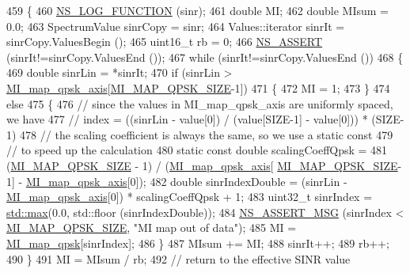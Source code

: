 \begin{DoxyCode}
459 \{
460   \hyperlink{log-macros-disabled_8h_a90b90d5bad1f39cb1b64923ea94c0761}{NS\_LOG\_FUNCTION} (sinr);
461   \textcolor{keywordtype}{double} MI;
462   \textcolor{keywordtype}{double} MIsum = 0.0;
463   SpectrumValue sinrCopy = sinr;
464   Values::iterator sinrIt = sinrCopy.ValuesBegin ();
465   uint16\_t rb = 0;
466   \hyperlink{assert_8h_a6dccdb0de9b252f60088ce281c49d052}{NS\_ASSERT} (sinrIt!=sinrCopy.ValuesEnd ());
467   \textcolor{keywordflow}{while} (sinrIt!=sinrCopy.ValuesEnd ())
468     \{
469       \textcolor{keywordtype}{double} sinrLin = *sinrIt;
470       \textcolor{keywordflow}{if} (sinrLin > \hyperlink{namespacens3_a8170078bba1537f2165fdd97e9a49d0f}{MI\_map\_qpsk\_axis}[\hyperlink{namespacens3_aae59b755610c3c0be0b839e4dcc933d6}{MI\_MAP\_QPSK\_SIZE}-1])
471         \{
472           MI = 1;
473         \}
474       \textcolor{keywordflow}{else} 
475         \{ 
476           \textcolor{comment}{// since the values in MI\_map\_qpsk\_axis are uniformly spaced, we have}
477           \textcolor{comment}{// index = ((sinrLin - value[0]) / (value[SIZE-1] - value[0])) * (SIZE-1)}
478               \textcolor{comment}{// the scaling coefficient is always the same, so we use a static const}
479               \textcolor{comment}{// to speed up the calculation}
480           \textcolor{keyword}{static} \textcolor{keyword}{const} \textcolor{keywordtype}{double} scalingCoeffQpsk = 
481             (\hyperlink{namespacens3_aae59b755610c3c0be0b839e4dcc933d6}{MI\_MAP\_QPSK\_SIZE} - 1) / (\hyperlink{namespacens3_a8170078bba1537f2165fdd97e9a49d0f}{MI\_map\_qpsk\_axis}[
      \hyperlink{namespacens3_aae59b755610c3c0be0b839e4dcc933d6}{MI\_MAP\_QPSK\_SIZE}-1] - \hyperlink{namespacens3_a8170078bba1537f2165fdd97e9a49d0f}{MI\_map\_qpsk\_axis}[0]);
482           \textcolor{keywordtype}{double} sinrIndexDouble = (sinrLin -  \hyperlink{namespacens3_a8170078bba1537f2165fdd97e9a49d0f}{MI\_map\_qpsk\_axis}[0]) * scalingCoeffQpsk + 1;
483           uint32\_t sinrIndex = \hyperlink{80211b_8c_affe776513b24d84b39af8ab0930fef7f}{std::max}(0.0, std::floor (sinrIndexDouble));
484           \hyperlink{assert_8h_aff5ece9066c74e681e74999856f08539}{NS\_ASSERT\_MSG} (sinrIndex < \hyperlink{namespacens3_aae59b755610c3c0be0b839e4dcc933d6}{MI\_MAP\_QPSK\_SIZE}, \textcolor{stringliteral}{"MI map out of data"});
485           MI = \hyperlink{namespacens3_a033a4853fbafa2f0685cfc40fafedac1}{MI\_map\_qpsk}[sinrIndex];
486         \}
487       MIsum += MI;
488       sinrIt++;
489       rb++;
490     \}
491   MI = MIsum / rb;
492   \textcolor{comment}{// return to the effective SINR value}

\end{DoxyCode}
